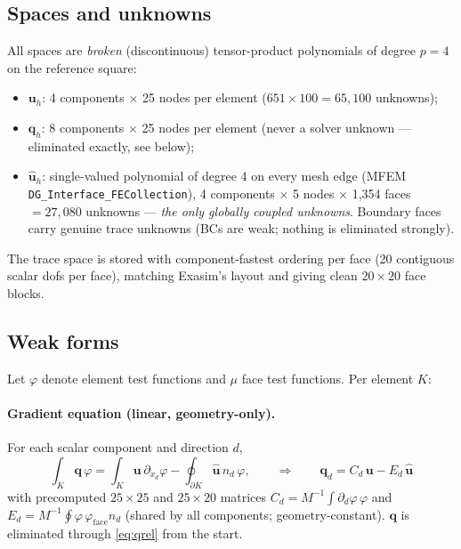 \documentclass[11pt]{article}
\newcommand{\bu}{\mathbf{u}}
\newcommand{\bq}{\mathbf{q}}
\newcommand{\buh}{\widehat{\mathbf{u}}}
\newcommand{\code}[1]{\texttt{#1}}
\begin{document}
\subsection{Spaces and unknowns}

All spaces are \emph{broken} (discontinuous) tensor-product polynomials of
degree $p=4$ on the reference square:
\begin{itemize}
\item $\bu_h$: 4 components $\times$ 25 nodes per element
($651\times100 = 65{,}100$ unknowns);
\item $\bq_h$: 8 components $\times$ 25 nodes per element (never a solver
unknown --- eliminated exactly, see below);
\item $\buh_h$: single-valued polynomial of degree 4 on every mesh edge
(MFEM \code{DG\_Interface\_FECollection}), 4 components $\times$ 5 nodes
$\times$ 1{,}354 faces $= 27{,}080$ unknowns --- \emph{the only globally
coupled unknowns}. Boundary faces carry genuine trace unknowns (BCs are
weak; nothing is eliminated strongly).
\end{itemize}
The trace space is stored with component-fastest ordering per face (20
contiguous scalar dofs per face), matching Exasim's layout and giving clean
$20\times20$ face blocks.

\subsection{Weak forms}

Let $\varphi$ denote element test functions and $\mu$ face test functions.
Per element $K$:

\paragraph{Gradient equation (linear, geometry-only).} For each scalar
component and direction $d$,
\begin{equation}
\int_K \bq\,\varphi
= \int_K \bu\,\partial_{x_d}\varphi
- \oint_{\partial K} \buh\, n_d\, \varphi ,
\qquad\Longrightarrow\qquad
\bq_d = C_d\,\bu - E_d\,\buh
\label{eq:qrel}
\end{equation}
with precomputed $25\times25$ and $25\times20$ matrices
$C_d = M^{-1}\!\int \partial_d\varphi\,\varphi$ and
$E_d = M^{-1}\!\oint \varphi\,\varphi_{\mathrm{face}} n_d$ (shared by all
components; geometry-constant). $\bq$ is eliminated through
\eqref{eq:qrel} from the start.
\end{document}
